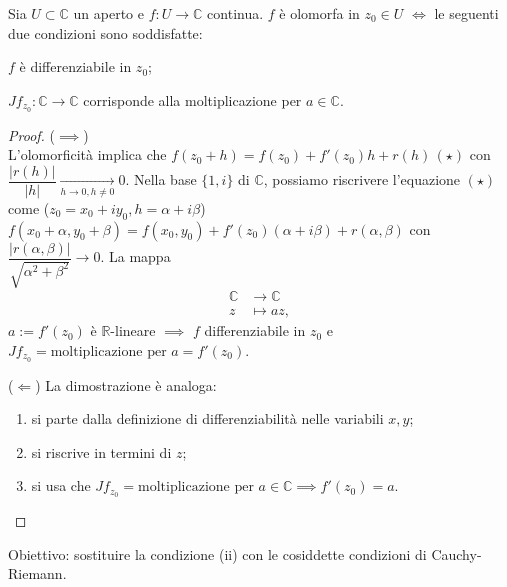 \begin{thm} \label{car_olo}
  Sia $U \subset \mathbb{C}$ un aperto e $f:U \longrightarrow \mathbb{C}$ continua. $f$ è olomorfa in $z_0 \in U$ $\iff$ le seguenti due condizioni sono soddisfatte:
  \begin{nlist}
    \item $f$ è differenziabile in $z_0$;
    \item $Jf_{z_0}:\mathbb{C} \longrightarrow \mathbb{C}$ corrisponde alla moltiplicazione per $a \in \mathbb{C}$.
  \end{nlist}
\end{thm}

\begin{proof}
  ($\implies$) \\ L'olomorficità implica che $f(z_0+h)=f(z_0)+f'(z_0)h+r(h) \, (\star)$ con \\ $\dfrac{|r(h)|}{|h|} \xrightarrow[h \longrightarrow 0, h \not=0]{} 0$.
  Nella base $\{1, i\}$ di $\mathbb{C}$, possiamo riscrivere l'equazione $(\star)$ come ($z_0=x_0+iy_0, h=\alpha+i\beta$) $f(x_0+\alpha, y_0+\beta)=f(x_0, y_0)+f'(z_0)(\alpha+i\beta)+r(\alpha, \beta)$ con $\dfrac{|r(\alpha, \beta)|}{\sqrt{\alpha^2+\beta^2}} \longrightarrow 0$.
  La mappa
  \begin{align*}
    \mathbb{C} &\longrightarrow \mathbb{C}\\
    z &\longmapsto az,
  \end{align*}
  $a:=f'(z_0)$ è $\mathbb{R}$-lineare $\implies$ $f$ differenziabile in $z_0$ e $Jf_{z_0}=\text{moltiplicazione per }a=f'(z_0)$.

  ($\Leftarrow$) La dimostrazione è analoga:
  \begin{enumerate}
    \item si parte dalla definizione di differenziabilità nelle variabili $x, y$;
    \item si riscrive in termini di $z$;
    \item si usa che $Jf_{z_0}=\text{moltiplicazione per }a \in \mathbb{C} \implies f'(z_0)=a$.
  \end{enumerate}
\end{proof}

Obiettivo: sostituire la condizione (ii) con le cosiddette condizioni di Cauchy-Riemann.

